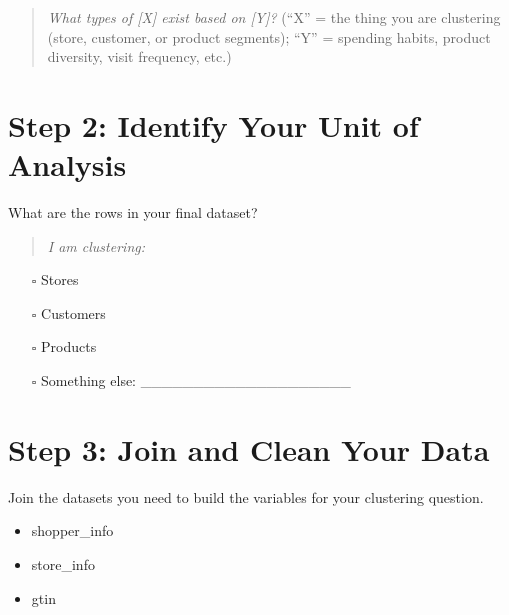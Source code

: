 \documentclass[
  11pt,
]{article}
\providecommand{\tightlist}{%
  \setlength{\itemsep}{0pt}\setlength{\parskip}{0pt}}\usepackage{longtable,booktabs,array}
\begin{document}
\vspace{2em}

\begin{quote}
\emph{What types of {[}X{]} exist based on {[}Y{]}?} (``X'' = the thing
you are clustering (store, customer, or product segments); ``Y'' =
spending habits, product diversity, visit frequency, etc.)
\end{quote}

\newpage

\section*{Step 2: Identify Your Unit of
Analysis}\label{step-2-identify-your-unit-of-analysis}

What are the rows in your final dataset?

\begin{quote}
\emph{I am clustering:}
\end{quote}

\begin{itemize}
\tightlist
\item[$\square$]
  Stores\\
\item[$\square$]
  Customers\\
\item[$\square$]
  Products\\
\item[$\square$]
  Something else: \_\_\_\_\_\_\_\_\_\_\_\_\_\_\_\_\_\_\_\_
\end{itemize}

\section*{Step 3: Join and Clean Your
Data}\label{step-3-join-and-clean-your-data}

Join the datasets you need to build the variables for your clustering
question.

\begin{itemize}
\tightlist
\item
  shopper\_info\\
\item
  store\_info\\
\item
  gtin
\end{itemize}
\end{document}

